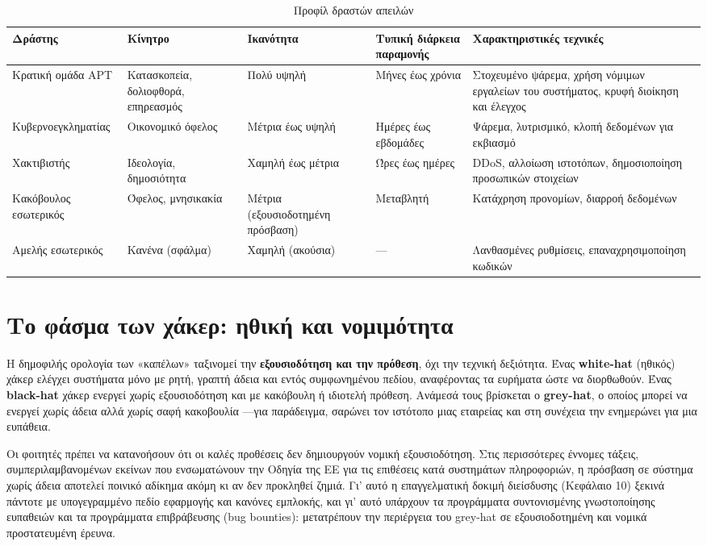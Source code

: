\documentclass[11pt,openany]{book}
\begin{document}
\begin{table}[htbp]
  \centering\small
  \caption{Προφίλ δραστών απειλών}
  \begin{tabularx}{\linewidth}{>{\raggedright\arraybackslash}X >{\raggedright\arraybackslash}X >{\raggedright\arraybackslash}X >{\raggedright\arraybackslash}X >{\raggedright\arraybackslash}X}
    \toprule
    \textbf{Δράστης} & \textbf{Κίνητρο} & \textbf{Ικανότητα} & \textbf{Τυπική διάρκεια παραμονής} & \textbf{Χαρακτηριστικές τεχνικές} \\
    \midrule
    Κρατική ομάδα APT & Κατασκοπεία, δολιοφθορά, επηρεασμός & Πολύ υψηλή & Μήνες έως χρόνια & Στοχευμένο ψάρεμα, χρήση νόμιμων εργαλείων του συστήματος, κρυφή διοίκηση και έλεγχος \\
    Κυβερνοεγκληματίας & Οικονομικό όφελος & Μέτρια έως υψηλή & Ημέρες έως εβδομάδες & Ψάρεμα, λυτρισμικό, κλοπή δεδομένων για εκβιασμό \\
    Χακτιβιστής & Ιδεολογία, δημοσιότητα & Χαμηλή έως μέτρια & Ώρες έως ημέρες & DDoS, αλλοίωση ιστοτόπων, δημοσιοποίηση προσωπικών στοιχείων \\
    Κακόβουλος εσωτερικός & Όφελος, μνησικακία & Μέτρια (εξουσιοδοτημένη πρόσβαση) & Μεταβλητή & Κατάχρηση προνομίων, διαρροή δεδομένων \\
    Αμελής εσωτερικός & Κανένα (σφάλμα) & Χαμηλή (ακούσια) & — & Λανθασμένες ρυθμίσεις, επαναχρησιμοποίηση κωδικών \\
    \bottomrule
  \end{tabularx}
\end{table}
\section{Το φάσμα των χάκερ: ηθική και νομιμότητα}\label{sec:3.2}
Η δημοφιλής ορολογία των «καπέλων» ταξινομεί την \textbf{εξουσιοδότηση και την πρόθεση}, όχι την τεχνική δεξιότητα. Ένας \textbf{white-hat} (ηθικός) χάκερ ελέγχει συστήματα μόνο με ρητή, γραπτή άδεια και εντός συμφωνημένου πεδίου, αναφέροντας τα ευρήματα ώστε να διορθωθούν. Ένας \textbf{black-hat} χάκερ ενεργεί χωρίς εξουσιοδότηση και με κακόβουλη ή ιδιοτελή πρόθεση. Ανάμεσά τους βρίσκεται ο \textbf{grey-hat}, ο οποίος μπορεί να ενεργεί χωρίς άδεια αλλά χωρίς σαφή κακοβουλία —για παράδειγμα, σαρώνει τον ιστότοπο μιας εταιρείας και στη συνέχεια την ενημερώνει για μια ευπάθεια.

Οι φοιτητές πρέπει να κατανοήσουν ότι οι καλές προθέσεις δεν δημιουργούν νομική εξουσιοδότηση. Στις περισσότερες έννομες τάξεις, συμπεριλαμβανομένων εκείνων που ενσωματώνουν την Οδηγία της ΕΕ για τις επιθέσεις κατά συστημάτων πληροφοριών, η πρόσβαση σε σύστημα χωρίς άδεια αποτελεί ποινικό αδίκημα ακόμη κι αν δεν προκληθεί ζημιά. Γι' αυτό η επαγγελματική δοκιμή διείσδυσης (Κεφάλαιο 10) ξεκινά πάντοτε με υπογεγραμμένο πεδίο εφαρμογής και κανόνες εμπλοκής, και γι' αυτό υπάρχουν τα προγράμματα συντονισμένης γνωστοποίησης ευπαθειών και τα προγράμματα επιβράβευσης (bug bounties): μετατρέπουν την περιέργεια του grey-hat σε εξουσιοδοτημένη και νομικά προστατευμένη έρευνα.
\end{document}
